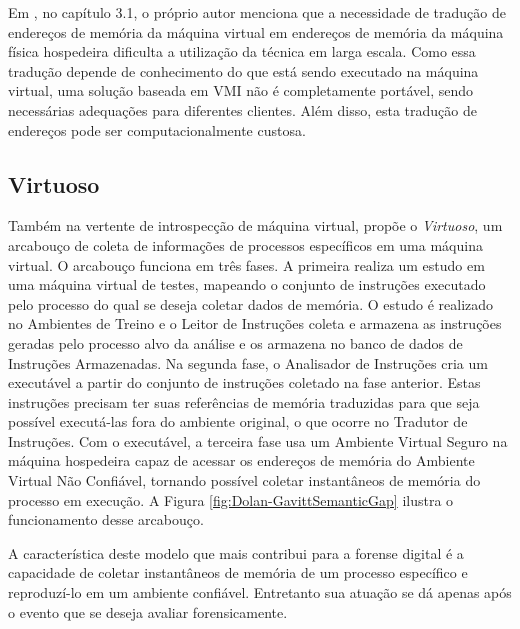 Em \cite{PoiselVMI:2013}, no capítulo 3.1, o próprio autor menciona que a necessidade de tradução de endereços de memória da máquina virtual em endereços de memória da máquina física hospedeira dificulta a utilização da técnica em larga escala.
%
Como essa tradução depende de conhecimento do que está sendo executado na máquina virtual, uma solução baseada em VMI não é completamente portável, sendo necessárias adequações para diferentes clientes.
%
Além disso, esta tradução de endereços pode ser computacionalmente custosa.%
%

\subsection{Virtuoso}
\label{sec:virtuoso}

Também na vertente de introspecção de máquina virtual, \cite{Dolan-GavittSemanticGap:2011} propõe o \textit{Virtuoso}, um arcabouço de coleta de informações de processos específicos em uma máquina virtual.
%
O arcabouço funciona em três fases.
%
A primeira realiza um estudo em uma máquina virtual de testes, mapeando o conjunto de instruções executado pelo processo do qual se deseja coletar dados de memória. 
%
O estudo é realizado no Ambientes de Treino e o Leitor de Instruções coleta e armazena as instruções geradas pelo processo alvo da análise e os armazena no banco de dados de Instruções Armazenadas.
%
Na segunda fase, o Analisador de Instruções cria um executável a partir do conjunto de instruções coletado na fase anterior. Estas instruções precisam ter suas referências de memória traduzidas para que seja possível executá-las fora do ambiente original, o que ocorre no Tradutor de Instruções.
%
Com o executável, a terceira fase usa um Ambiente Virtual Seguro na máquina hospedeira capaz de acessar os endereços de memória do Ambiente Virtual Não Confiável, tornando possível coletar instantâneos de memória do processo em execução.
%
A Figura \ref{fig:Dolan-GavittSemanticGap} ilustra o funcionamento desse arcabouço. 


A característica deste modelo que mais contribui para a forense digital é a capacidade de coletar instantâneos de memória de um processo específico e reproduzí-lo em um ambiente confiável. Entretanto  sua atuação se dá apenas após o evento que se deseja avaliar forensicamente.
%


